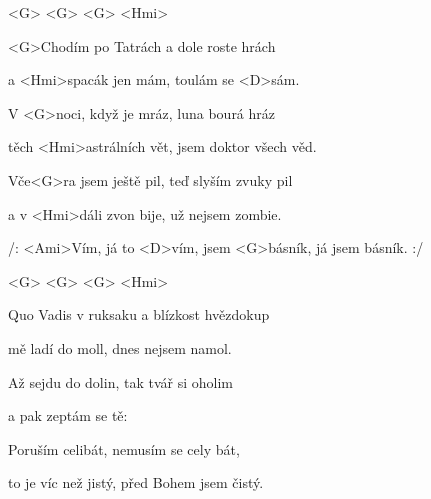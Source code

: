 

<G> <G> <G> <Hmi>

\zs
<G>Chodím po Tatrách a dole roste hrách

a <Hmi>spacák jen mám, toulám se <D>sám.

V <G>noci, když je mráz, luna bourá hráz

těch <Hmi>astrálních vět, jsem doktor všech věd.

Vče<G>ra jsem ještě pil, teď slyším zvuky pil

a v <Hmi>dáli zvon bije, už nejsem zombie.
\ks

\zr
/: <Ami>Vím, já to <D>vím,
jsem <G>básník, já jsem básník. :/
\kr

<G> <G> <G> <Hmi>

\zs
Quo Vadis v ruksaku a blízkost hvězdokup

mě ladí do moll, dnes nejsem namol.

Až sejdu do dolin, tak tvář si oholim

a pak zeptám se tě: 

Poruším celibát, nemusím se cely bát,

to je víc než jistý, před Bohem jsem čistý.
\ks

\zr \kr \zr \kr \zr \kr

\kp
